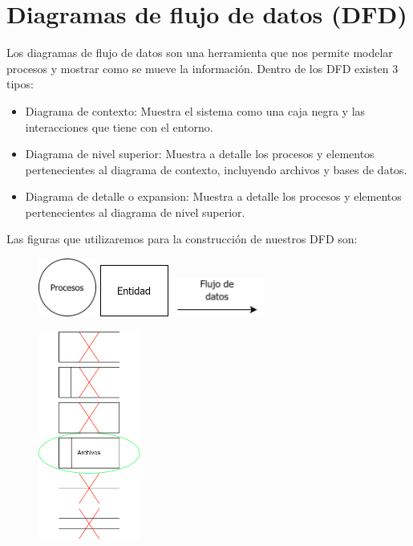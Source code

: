 \documentclass{templateNote}
\begin{document}
\section{Diagramas de flujo de datos (\textbf{DFD})} 
\noindent Los diagramas de flujo de datos son una herramienta que nos permite modelar procesos y mostrar como se mueve la información. Dentro de los DFD existen 3 tipos:
\begin{itemize}
    \item Diagrama de contexto: Muestra el sistema como una caja negra y las interacciones que tiene con el entorno.
    \item Diagrama de nivel superior: Muestra a detalle los procesos y elementos pertenecientes al diagrama de contexto, incluyendo archivos y bases de datos.
    \item Diagrama de detalle o expansion: Muestra a detalle los procesos y elementos pertenecientes al diagrama de nivel superior.
\end{itemize}
Las figuras que utilizaremos para la construcción de nuestros DFD son:
\begin{figure}[H]
    \centering
    \includegraphics[width=0.17\textwidth]{img/procesos.png}\hspace{1cm}
    \includegraphics[width=0.20\textwidth]{img/entidad.png}\hspace{1cm}
    \includegraphics[width=0.27\textwidth]{img/flujo.png}\hspace{1cm}
\end{figure}
\begin{figure}[H]
    \centering
    \includegraphics[width=0.30\textwidth]{img/archivos.png}
\end{figure}
\end{document}
